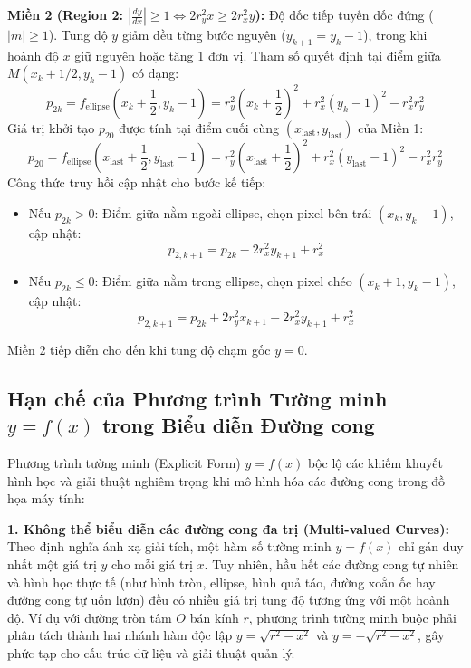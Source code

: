 \textbf{Miền 2 (Region 2: $|\frac{dy}{dx}| \ge 1 \iff 2 r_y^2 x \ge 2 r_x^2 y$):}
Độ dốc tiếp tuyến dốc đứng ($|m| \ge 1$). Tung độ $y$ giảm đều từng bước nguyên ($y_{k+1} = y_k - 1$), trong khi hoành độ $x$ giữ nguyên hoặc tăng 1 đơn vị. Tham số quyết định tại điểm giữa $M(x_k + 1/2, y_k - 1)$ có dạng:
\begin{equation}
p_{2k} = f_{\text{ellipse}}\left( x_k + \frac{1}{2}, y_k - 1 \right) = r_y^2 \left( x_k + \frac{1}{2} \right)^2 + r_x^2 (y_k - 1)^2 - r_x^2 r_y^2
\end{equation}
Giá trị khởi tạo $p_{20}$ được tính tại điểm cuối cùng $(x_{\text{last}}, y_{\text{last}})$ của Miền 1:
\begin{equation}
p_{20} = f_{\text{ellipse}}\left( x_{\text{last}} + \frac{1}{2}, y_{\text{last}} - 1 \right) = r_y^2 \left( x_{\text{last}} + \frac{1}{2} \right)^2 + r_x^2 (y_{\text{last}} - 1)^2 - r_x^2 r_y^2
\end{equation}
Công thức truy hồi cập nhật cho bước kế tiếp:
\begin{itemize}
    \item Nếu $p_{2k} > 0$: Điểm giữa nằm ngoài ellipse, chọn pixel bên trái $(x_k, y_k - 1)$, cập nhật:
    \begin{equation}
    p_{2, k+1} = p_{2k} - 2 r_x^2 y_{k+1} + r_x^2
    \end{equation}
    \item Nếu $p_{2k} \le 0$: Điểm giữa nằm trong ellipse, chọn pixel chéo $(x_k + 1, y_k - 1)$, cập nhật:
    \begin{equation}
    p_{2, k+1} = p_{2k} + 2 r_y^2 x_{k+1} - 2 r_x^2 y_{k+1} + r_x^2
    \end{equation}
\end{itemize}
Miền 2 tiếp diễn cho đến khi tung độ chạm gốc $y = 0$.

\subsection{Hạn chế của Phương trình Tường minh \texorpdfstring{$y = f(x)$}{y = f(x)} trong Biểu diễn Đường cong}
\label{subsec:w5_explicit}

Phương trình tường minh (Explicit Form) $y = f(x)$ bộc lộ các khiếm khuyết hình học và giải thuật nghiêm trọng khi mô hình hóa các đường cong trong đồ họa máy tính:

\textbf{1. Không thể biểu diễn các đường cong đa trị (Multi-valued Curves):}
Theo định nghĩa ánh xạ giải tích, một hàm số tường minh $y = f(x)$ chỉ gán duy nhất một giá trị $y$ cho mỗi giá trị $x$. Tuy nhiên, hầu hết các đường cong tự nhiên và hình học thực tế (như hình tròn, ellipse, hình quả táo, đường xoắn ốc hay đường cong tự uốn lượn) đều có nhiều giá trị tung độ tương ứng với một hoành độ. Ví dụ với đường tròn tâm $O$ bán kính $r$, phương trình tường minh buộc phải phân tách thành hai nhánh hàm độc lập $y = \sqrt{r^2 - x^2}$ và $y = -\sqrt{r^2 - x^2}$, gây phức tạp cho cấu trúc dữ liệu và giải thuật quản lý.

